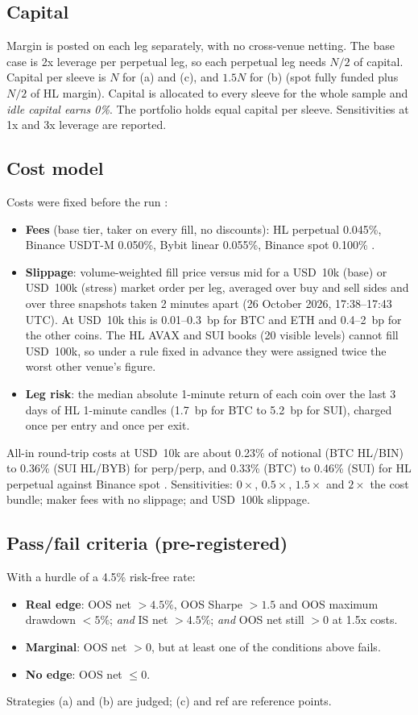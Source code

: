 \documentclass[11pt,a4paper]{article}
\begin{document}
\subsection{Capital}
Margin is posted on each leg separately, with no cross-venue netting. The base case is 2x leverage per perpetual leg, so each perpetual leg needs $N/2$ of capital. Capital per sleeve is $N$ for (a) and (c), and $1.5N$ for (b) (spot fully funded plus $N/2$ of HL margin).
Capital is allocated to every sleeve for the whole sample and \emph{idle capital earns 0\%}. The portfolio holds equal capital per sleeve. Sensitivities at 1x and 3x leverage are reported.

\subsection{Cost model}
Costs were fixed before the run \citep{prereg}:
\begin{itemize}
\item \textbf{Fees} (base tier, taker on every fill, no discounts): HL perpetual 0.045\%, Binance USDT-M 0.050\%, Bybit linear 0.055\%, Binance spot 0.100\% \citep{hl_fees}.
\item \textbf{Slippage}: volume-weighted fill price versus mid for a USD~10k (base) or USD~100k (stress) market order per leg, averaged over buy and sell sides and over three snapshots taken 2 minutes apart (26 October 2026, 17:38--17:43 UTC). At USD~10k this is 0.01--0.3~bp for BTC and ETH and 0.4--2~bp for the other coins. The HL AVAX and SUI books (20 visible levels) cannot fill USD~100k, so under a rule fixed in advance they were assigned twice the worst other venue's figure.
\item \textbf{Leg risk}: the median absolute 1-minute return of each coin over the last 3 days of HL 1-minute candles (1.7~bp for BTC to 5.2~bp for SUI), charged once per entry and once per exit.
\end{itemize}
All-in round-trip costs at USD~10k are about 0.23\% of notional (BTC HL/BIN) to 0.36\% (SUI HL/BYB) for perp/perp, and 0.33\% (BTC) to 0.46\% (SUI) for HL perpetual against Binance spot \citep{carry_v1}.
Sensitivities: $0\times$, $0.5\times$, $1.5\times$ and $2\times$ the cost bundle; maker fees with no slippage; and USD~100k slippage.

\subsection{Pass/fail criteria (pre-registered)}
With a hurdle of a 4.5\% risk-free rate:
\begin{itemize}
\item \textbf{Real edge}: OOS net $>4.5\%$, OOS Sharpe $>1.5$ and OOS maximum drawdown $<5\%$; \emph{and} IS net $>4.5\%$; \emph{and} OOS net still $>0$ at 1.5x costs.
\item \textbf{Marginal}: OOS net $>0$, but at least one of the conditions above fails.
\item \textbf{No edge}: OOS net $\le 0$.
\end{itemize}
Strategies (a) and (b) are judged; (c) and ref are reference points.
\end{document}
